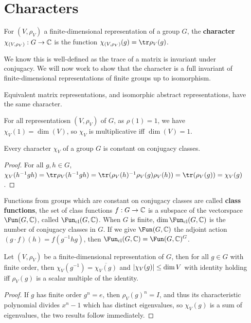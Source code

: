 \documentclass{article}
\begin{document}
\section{Characters}

\begin{definition}
    For $(V,\rho_V)$ a finite-dimensional representation of a group $G$, the \textbf{character} $\chi_{(V,\rho_V)}:G\rightarrow \mathbb{C}$ is the function $\chi_{(V,\rho_V)}(g) = \tr\rho_V(g)$.
\end{definition}

We know this is well-defined as the trace of a matrix is invariant under conjugacy. We will now work to show that the character is a full invariant of finite-dimensional representations of finite groups up to isomorphism.

\begin{lemma}
    Equivalent matrix representations, and isomorphic abstract representations, have the same character.
\end{lemma}

For all representatiosn $(V,\rho_V)$ of $G$, as $\rho(1)=1$, we have $\chi_V(1) = \dim(V)$, so $\chi_V$ is multiplicative iff $\dim(V)=1$.

\begin{proposition}
    Every character $\chi_V$ of a group $G$ is constant on conjugacy classes.\begin{proof}
        For all $g,h\in G$, $\chi_V(h^{-1}gh) = \tr\rho_V(h^{-1}gh) = \tr(\rho_V(h)^{-1}\rho_V(g)\rho_V(h)) = \tr(\rho_V(g)) = \chi_V(g)$.
    \end{proof}
\end{proposition}

Functions from groups which are constant on conjugacy classes are called \textbf{class functions}, the set of class functions $f:G\rightarrow \mathbb{C}$ is a subspace of the vectorspace $\Fun(G,\bC)$, called $\Fun_\text{cl}(G,\bC)$. When $G$ is finite, $\dim\Fun_\text{cl}(G,\bC)$ is the number of conjugacy classes in $G$. If we give $\Fun(G,\bC)$ the adjoint action $(g\cdot f)(h) = f(g^{-1}hg)$, then $\Fun_\text{cl}(G,\bC) = \Fun(G,\bC)^G$.

\begin{proposition}
    Let $(V,\rho_V)$ be a finite-dimensional representation of $G$, then for all $g\in G$ with finite order, then $\chi_V(g^{-1}) = \overline{\chi_V(g)}$ and $\left| \chi_V(g) \right|\leq \dim V$ with identity holding iff $\rho_V(g)$ is a scalar multiple of the identity.\begin{proof}
        If $g$ has finite order $g^n=e$, then $\rho_V(g)^n = I$, and thus its characteristic polynomial divides $x^n-1$ which has distinct eigenvalues, so $\chi_V(g)$ is a sum of eigenvalues, the two results follow immediately.
    \end{proof}
\end{proposition}
\end{document}
